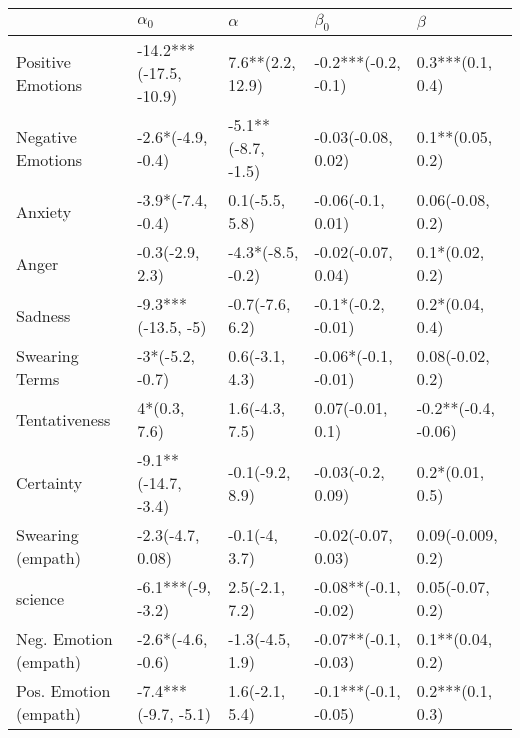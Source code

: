 \begin{tabular}{lllll}
\toprule
{} &              $\alpha_0$ &            $\alpha$ &             $\beta_0$ &              $\beta$ \\
\midrule
Positive Emotions     &  -14.2***(-17.5, -10.9) &    7.6**(2.2, 12.9) &   -0.2***(-0.2, -0.1) &     0.3***(0.1, 0.4) \\
Negative Emotions     &       -2.6*(-4.9, -0.4) &  -5.1**(-8.7, -1.5) &    -0.03(-0.08, 0.02) &     0.1**(0.05, 0.2) \\
Anxiety               &       -3.9*(-7.4, -0.4) &      0.1(-5.5, 5.8) &     -0.06(-0.1, 0.01) &     0.06(-0.08, 0.2) \\
Anger                 &         -0.3(-2.9, 2.3) &   -4.3*(-8.5, -0.2) &    -0.02(-0.07, 0.04) &      0.1*(0.02, 0.2) \\
Sadness               &      -9.3***(-13.5, -5) &     -0.7(-7.6, 6.2) &    -0.1*(-0.2, -0.01) &      0.2*(0.04, 0.4) \\
Swearing Terms        &         -3*(-5.2, -0.7) &      0.6(-3.1, 4.3) &   -0.06*(-0.1, -0.01) &     0.08(-0.02, 0.2) \\
Tentativeness         &            4*(0.3, 7.6) &      1.6(-4.3, 7.5) &      0.07(-0.01, 0.1) &  -0.2**(-0.4, -0.06) \\
Certainty             &     -9.1**(-14.7, -3.4) &     -0.1(-9.2, 8.9) &     -0.03(-0.2, 0.09) &      0.2*(0.01, 0.5) \\
Swearing (empath)     &        -2.3(-4.7, 0.08) &       -0.1(-4, 3.7) &    -0.02(-0.07, 0.03) &    0.09(-0.009, 0.2) \\
science               &       -6.1***(-9, -3.2) &      2.5(-2.1, 7.2) &  -0.08**(-0.1, -0.02) &     0.05(-0.07, 0.2) \\
Neg. Emotion (empath) &       -2.6*(-4.6, -0.6) &     -1.3(-4.5, 1.9) &  -0.07**(-0.1, -0.03) &     0.1**(0.04, 0.2) \\
Pos. Emotion (empath) &     -7.4***(-9.7, -5.1) &      1.6(-2.1, 5.4) &  -0.1***(-0.1, -0.05) &     0.2***(0.1, 0.3) \\
\bottomrule
\end{tabular}
